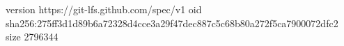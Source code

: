 version https://git-lfs.github.com/spec/v1
oid sha256:275ff3d1d89b6a72328d4cce3a29f47dec887c5c68b80a272f5ca7900072dfc2
size 2796344
